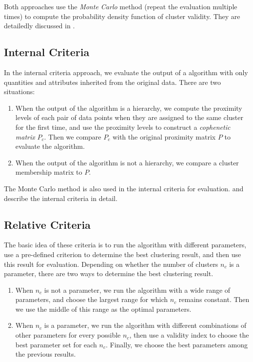 \documentclass[conference]{IEEEtran}
\begin{document}
Both approaches use the \textit{Monte Carlo} method (repeat the evaluation multiple times) to compute the probability density function of cluster validity. They are detailedly discussed in \cite{Halkidi:2002:CVM:565117.565124}.

\subsection{Internal Criteria}
In the internal criteria approach, we evaluate the output of a algorithm with only quantities and attributes inherited from the original data. There are two situations:

\begin{enumerate}
\item When the output of the algorithm is a hierarchy, we compute the proximity levels of each pair of data points when they are assigned to the same cluster for the first time, and use the proximity levels to construct a \textit{cophenetic matrix} $P_c$. Then we compare $P_c$ with the original proximity matrix $P$ to evaluate the algorithm.
\item When the output of the algorithm is not a hierarchy, we compare a cluster membership matrix to $P$.
\end{enumerate}

The Monte Carlo method is also used in the internal criteria for evaluation. \cite{Halkidi:2002:CVM:565117.565124} and \cite{milligan1981monte} describe the internal criteria in detail.

\subsection{Relative Criteria}
The basic idea of these criteria is to run the algorithm with different parameters, use a pre-defined criterion to determine the best clustering result, and then use this result for evaluation. Depending on whether the number of clusters $n_c$ is a parameter, there are two ways to determine the best clustering result.

\begin{enumerate}
\item When $n_c$ is not a parameter, we run the algorithm with a wide range of parameters, and choose the largest range for which $n_c$ remains constant. Then we use the middle of this range as the optimal parameters.
\item When $n_c$ is a parameter, we run the algorithm  with different combinations of other parameters for every possible $n_c$, then use a validity index to choose the best parameter set for each $n_c$. Finally, we choose the best parameters among the previous results.
\end{enumerate}
\end{document}
